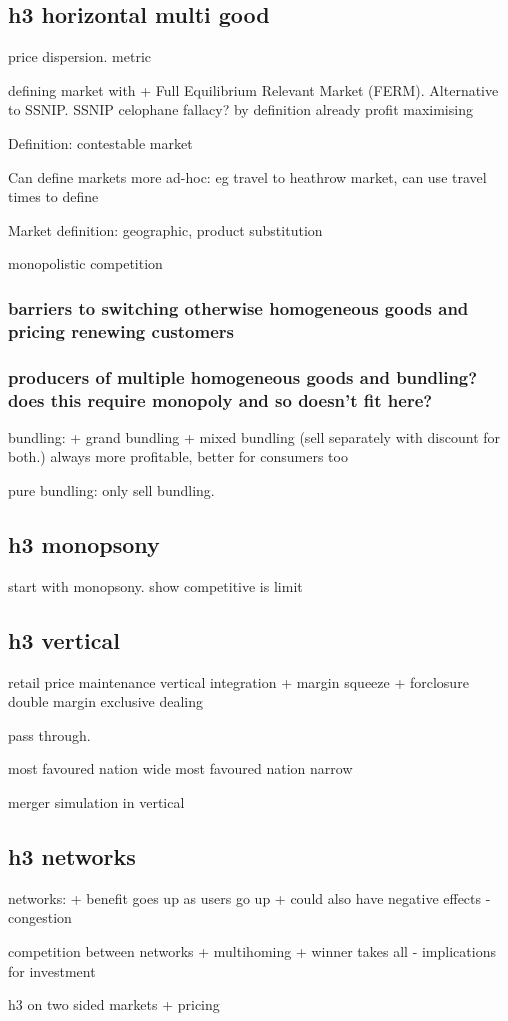 \subsection{h3 horizontal multi good}

price dispersion. metric

defining market with
+ Full Equilibrium Relevant Market (FERM). Alternative to SSNIP.
SSNIP
celophane fallacy? by definition already profit maximising

Definition: contestable market

Can define markets more ad-hoc: eg travel to heathrow market, can use travel times to define

Market definition: geographic, product substitution

monopolistic competition

\subsubsection{barriers to switching otherwise homogeneous goods and pricing renewing customers}
\subsubsection{producers of multiple homogeneous goods and bundling? does this require monopoly and so doesn't fit here?}

bundling:
+ grand bundling
+ mixed bundling (sell separately with discount for both.)
always more profitable, better for consumers too

pure bundling: only sell bundling.
\subsection{h3 monopsony}
start with monopsony. show competitive is limit
\subsection{h3 vertical}
retail price maintenance
vertical integration
+ margin squeeze
+ forclosure
double margin
exclusive dealing

pass through.

most favoured nation wide
most favoured nation narrow

merger simulation in vertical
\subsection{h3 networks}
networks:
+ benefit goes up as users go up
+ could also have negative effects - congestion

competition between networks
+ multihoming
+ winner takes all - implications for investment

h3 on two sided markets
+ pricing

